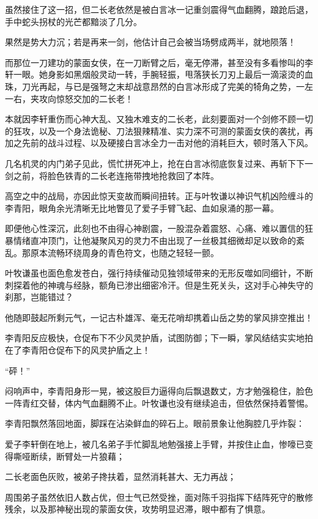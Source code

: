 虽然接住了这一招，但二长老依然是被白言冰一记重剑震得气血翻腾，踉跄后退，手中蛇头拐杖的光芒都黯淡了几分。

果然是势大力沉；若是再来一剑，他估计自己会被当场劈成两半，就地陨落！

而那位一刀建功的蒙面女侠，在一刀断臂之后，毫无停滞，甚至没有多看惨叫的李轩一眼。她身影如黑烟般灵动一转，手腕轻振，甩落狭长刀刃上最后一滴滚烫的血珠，刀光再起，与已是强弩之末却战意昂然的白言冰形成了完美的犄角之势，一左一右，夹攻向惊怒交加的二长老！

本就因李轩重伤而心神大乱、又独木难支的二长老，此刻要面对一个剑修不顾一切的狂攻，以及一个身法诡秘、刀法狠辣精准、实力深不可测的蒙面女侠的袭扰，再加之先前的战斗过程、以及硬接白言冰全力一击对他的消耗巨大，顿时落入下风。

几名机灵的内门弟子见此，慌忙拼死冲上，抢在白言冰彻底恢复过来、再斩下下一剑之前，将脸色铁青的二长老连拖带拽地抢救回了本阵。

高空之中的战局，亦因此惊天变故而瞬间扭转。正与叶牧谦以神识气机凶险缠斗的李青阳，眼角余光清晰无比地瞥见了爱子手臂飞起、血如泉涌的那一幕。

即便他心性深沉，此刻也不由得心神剧震，一股混杂着震怒、心痛、难以置信的狂暴情绪直冲顶门，让他凝聚风刃的灵力不由出现了一丝极其细微却足以致命的紊乱。那原本流畅环绕周身的青色符文，也随之轻轻一颤。

叶牧谦虽也面色愈发苍白，强行持续催动见独领域带来的无形反噬如同细针，不断刺探着他的神魂与经脉，额角已渗出细密冷汗。但是生死关头，这对手心神失守的刹那，岂能错过？

他随即鼓起所剩元气，一记古朴雄浑、毫无花哨却携着山岳之势的掌风排空推出！

李青阳反应极快，仓促布下不少风灵护盾，试图防御；下一瞬，掌风结结实实地拍在了李青阳仓促布下的风灵护盾之上！

“砰！”

闷响声中，李青阳身形一晃，被这股巨力逼得向后飘退数丈，方才勉强稳住，脸色一阵青红交替，体内气血翻腾不止。叶牧谦也没有继续追击，但依然保持着警惕。

李青阳飘然落回地面，脚踩在沾染鲜血的碎石上。眼前景象让他胸腔几乎炸裂：

爱子李轩倒在地上，被几名弟子手忙脚乱地勉强接上手臂，并按住止血，惨嚎已变得嘶哑断续，断臂处一片狼藉；

二长老面色灰败，被弟子搀扶着，显然消耗甚大、无力再战；

周围弟子虽然依旧人数占优，但士气已然受挫，面对陈千羽指挥下结阵死守的散修残余，以及那神秘出现的蒙面女侠，攻势明显迟滞，眼中都有了惧意。

